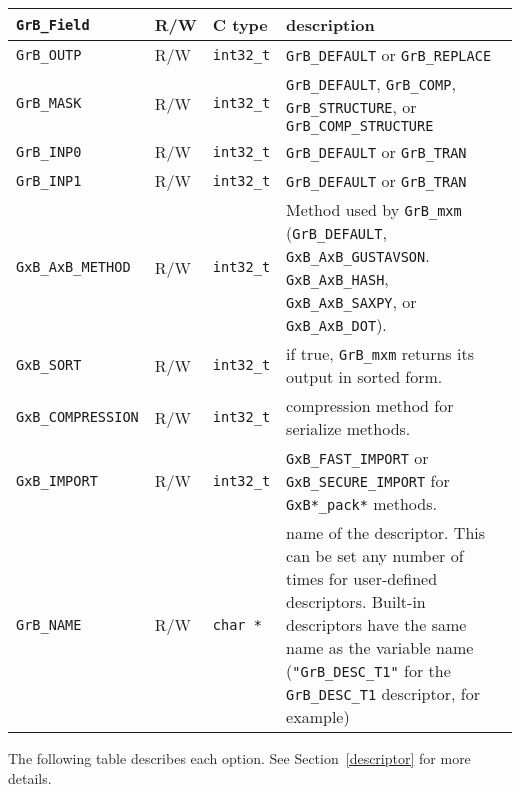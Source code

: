 \noindent
{\small
\begin{tabular}{|l|l|l|p{3.3in}|}
\hline
\verb'GrB_Field'                    & R/W  & C type        & description \\
\hline
\verb'GrB_OUTP'         & R/W  & \verb'int32_t'& \verb'GrB_DEFAULT' or \verb'GrB_REPLACE' \\
\verb'GrB_MASK'         & R/W  & \verb'int32_t'& \verb'GrB_DEFAULT', \verb'GrB_COMP', \verb'GrB_STRUCTURE', or
                                                    \newline \verb'GrB_COMP_STRUCTURE' \\
\verb'GrB_INP0'         & R/W  & \verb'int32_t'& \verb'GrB_DEFAULT' or \verb'GrB_TRAN' \\
\verb'GrB_INP1'         & R/W  & \verb'int32_t'& \verb'GrB_DEFAULT' or \verb'GrB_TRAN' \\
\verb'GxB_AxB_METHOD'   & R/W  & \verb'int32_t'& Method used by \verb'GrB_mxm' (\verb'GrB_DEFAULT', \newline
                                                 \verb'GxB_AxB_GUSTAVSON'.  \verb'GxB_AxB_HASH', \newline
                                                 \verb'GxB_AxB_SAXPY', or \verb'GxB_AxB_DOT'). \\
\verb'GxB_SORT'         & R/W  & \verb'int32_t'& if true, \verb'GrB_mxm' returns its output in sorted form. \\
\verb'GxB_COMPRESSION'  & R/W  & \verb'int32_t'& compression method for serialize methods. \\
\verb'GxB_IMPORT'       & R/W  & \verb'int32_t'& \verb'GxB_FAST_IMPORT' or \verb'GxB_SECURE_IMPORT' for \verb'GxB*_pack*' methods. \\
\hline
\verb'GrB_NAME'         & R/W  & \verb'char *' & name of the descriptor.
    This can be set any number of times for user-defined descriptors.  Built-in
    descriptors have the same name as the variable name (\verb'"GrB_DESC_T1"'
    for the \verb'GrB_DESC_T1' descriptor, for example) \\
\hline
\end{tabular}
}

The following table describes each option.
See Section~\ref{descriptor} for more details.

